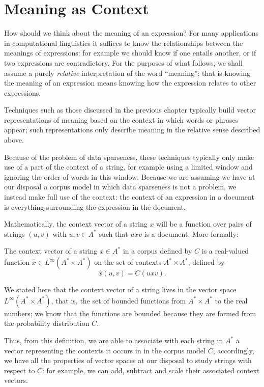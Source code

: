 \section{Meaning as Context}

 How should we think about the meaning of an expression? For many applications in computational linguistics it suffices to know the relationships between the meanings of expressions: for example we should know if one entails another, or if two expressions are contradictory. For the purposes of what follows, we shall assume a purely \emph{relative} interpretation of the word ``meaning''; that is knowing the meaning of an expression means knowing how the expression relates to other expressions.

Techniques such as those discussed in the previous chapter typically build vector representations of meaning based on the context in which words or phrases appear; such representations only describe meaning in the relative sense described above.

Because of the problem of data sparseness, these techniques typically only make use of a part of the context of a string, for example using a limited window and ignoring the order of words in this window. Because we are assuming we have at our disposal a corpus model in which data sparseness is not a problem, we instead make full use of the context: the context of an expression in a document is  everything surrounding the expression in the document.


Mathematically, the context vector of a string $x$ will be a function over pairs of strings $(u,v)$ with $u,v \in A^*$ such that $uxv$ is a document. More formally:
\begin{defn}
The context vector of a string $x \in A^*$ in a corpus defined by $C$ is a real-valued function $\hat{x}\in L^\infty(A^*\times A^*)$  on the set of contexts $A^* \times A^*$, defined by
$$\hat{x}(u,v) = C(uxv).$$
\end{defn}

We stated here that the context vector of a string lives in the vector space $L^\infty(A^*\times A^*)$, that is, the set of bounded functions from $A^*\times A^*$ to the real numbers; we know that the functions are bounded because they are formed from the probability distribution $C$.

Thus, from this definition, we are able to associate with each string in $A^*$ a vector representing the contexts it occurs in in the corpus model $C$, accordingly, we have all the properties of vector spaces at our disposal to study strings with respect to $C$: for example, we can add, subtract and scale their associated context vectors.

